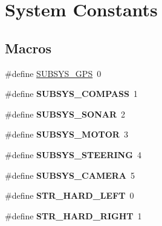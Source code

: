 \hypertarget{group__system__consts}{\section{System Constants}
\label{group__system__consts}
}
\subsection*{Macros}
\begin{DoxyCompactItemize}
\item 
\#define \hyperlink{group__system__consts_ga468920c27e6f462f4319229cda832476}{S\-U\-B\-S\-Y\-S\-\_\-\-G\-P\-S}~0
\item 
\hypertarget{group__system__consts_ga7476b8f22f1670fcf89da75d9fe3b643}{\#define {\bfseries S\-U\-B\-S\-Y\-S\-\_\-\-C\-O\-M\-P\-A\-S\-S}~1}\label{group__system__consts_ga7476b8f22f1670fcf89da75d9fe3b643}

\item 
\hypertarget{group__system__consts_ga3ce4f17430989c1b4d5b0ae9ddb38df8}{\#define {\bfseries S\-U\-B\-S\-Y\-S\-\_\-\-S\-O\-N\-A\-R}~2}\label{group__system__consts_ga3ce4f17430989c1b4d5b0ae9ddb38df8}

\item 
\hypertarget{group__system__consts_gaf957c814784b521302308d9de3fe07d1}{\#define {\bfseries S\-U\-B\-S\-Y\-S\-\_\-\-M\-O\-T\-O\-R}~3}\label{group__system__consts_gaf957c814784b521302308d9de3fe07d1}

\item 
\hypertarget{group__system__consts_ga8c00ac0932359e608b0870b1cfa7b7dc}{\#define {\bfseries S\-U\-B\-S\-Y\-S\-\_\-\-S\-T\-E\-E\-R\-I\-N\-G}~4}\label{group__system__consts_ga8c00ac0932359e608b0870b1cfa7b7dc}

\item 
\hypertarget{group__system__consts_ga7ab9ade0a6a5934eb6ad244e1130929f}{\#define {\bfseries S\-U\-B\-S\-Y\-S\-\_\-\-C\-A\-M\-E\-R\-A}~5}\label{group__system__consts_ga7ab9ade0a6a5934eb6ad244e1130929f}

\item 
\hypertarget{group__system__consts_ga0c1cb6fd30382725c9828e619d0d813c}{\#define {\bfseries S\-T\-R\-\_\-\-H\-A\-R\-D\-\_\-\-L\-E\-F\-T}~0}\label{group__system__consts_ga0c1cb6fd30382725c9828e619d0d813c}

\item 
\hypertarget{group__system__consts_ga9460f3ea1c94d0cbea0651cea23a6b90}{\#define {\bfseries S\-T\-R\-\_\-\-H\-A\-R\-D\-\_\-\-R\-I\-G\-H\-T}~1}\label{group__system__consts_ga9460f3ea1c94d0cbea0651cea23a6b90}


\end{DoxyCompactItemize}
